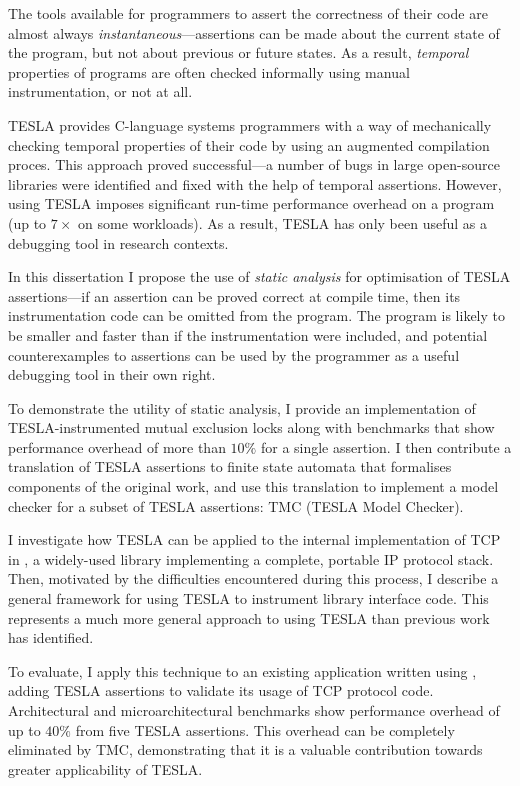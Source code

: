 The tools available for programmers to assert the correctness of their code are
almost always \emph{instantaneous}---assertions can be made about the current
state of the program, but not about previous or future states. As a result,
\emph{temporal} properties of programs are often checked informally using manual
instrumentation, or not at all.

TESLA \cite{anderson_tesla:_2014} provides C-language systems programmers with a
way of mechanically checking temporal properties of their code by using an
augmented compilation proces. This approach proved successful---a number of bugs
in large open-source libraries were identified and fixed with the help of
temporal assertions. However, using TESLA imposes significant run-time
performance overhead on a program (up to $7\times$ on some workloads). As a
result, TESLA has only been useful as a debugging tool in research contexts.

In this dissertation I propose the use of \emph{static analysis} for
optimisation of TESLA assertions---if an assertion can be proved correct at
compile time, then its instrumentation code can be omitted from the program. The
program is likely to be smaller and faster than if the instrumentation were
included, and potential counterexamples to assertions can be used by the
programmer as a useful debugging tool in their own right.

To demonstrate the utility of static analysis, I provide an implementation of
TESLA-instrumented mutual exclusion locks along with benchmarks that show
performance overhead of more than $10\%$ for a single assertion. I then
contribute a translation of TESLA assertions to finite state automata that
formalises components of the original work, and use this translation to
implement a model checker for a subset of TESLA assertions: TMC (TESLA Model
Checker).

I investigate how TESLA can be applied to the internal implementation of TCP in
\lwip{} \cite{dunkels_design_2001}, a widely-used library implementing a
complete, portable IP protocol stack. Then, motivated by the difficulties
encountered during this process, I describe a general framework for using TESLA
to instrument library interface code. This represents a much more general
approach to using TESLA than previous work has identified.

To evaluate, I apply this technique to an existing application written using
\lwip{}, adding TESLA assertions to validate its usage of TCP protocol code.
Architectural and microarchitectural benchmarks show performance overhead of up
to $40\%$ from five TESLA assertions. This overhead can be completely eliminated
by TMC, demonstrating that it is a valuable contribution towards greater
applicability of TESLA.
